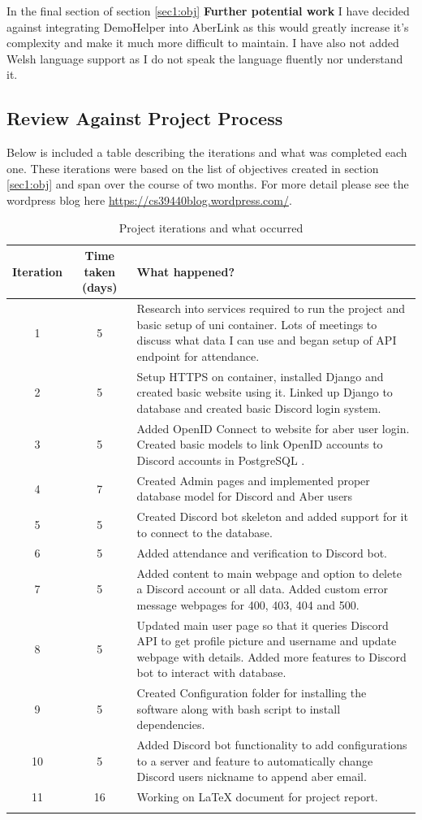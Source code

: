 In the final section of section \ref{sec1:obj} \textbf{Further potential work} I have decided against integrating DemoHelper into AberLink as this would greatly increase it's complexity and make it much more difficult to maintain. I have also not added Welsh language support as I do not speak the language fluently nor understand it.

\subsection{Review Against Project Process}\label{sec3:pp}

Below is included a table describing the iterations and what was completed each one. These iterations were based on the list of objectives created in section \ref{sec1:obj} and span over the course of two months. For more detail please see the wordpress blog here \href{https://cs39440blog.wordpress.com/}{https://cs39440blog.wordpress.com/}.

\begin{longtable}[H]{| c | c | p{9cm} |}
\hline
Iteration & Time taken (days) & What happened? \\
\hline
1 & 5 & Research into services required to run the project and basic setup of uni container. Lots of meetings to discuss what data I can use and began setup of API endpoint for attendance. \\
\hline
2 & 5 & Setup HTTPS on container, installed Django \cite{Django} and created basic website using it. Linked up Django to database and created basic Discord login system. \\
\hline
3 & 5 & Added OpenID Connect \cite{OpenID} to website for aber user login. Created basic models to link OpenID accounts to Discord accounts in PostgreSQL \cite{psql}. \\
\hline
4 & 7 & Created Admin pages and implemented proper database model for Discord and Aber users\\
\hline
5 & 5 & Created Discord bot skeleton and added support for it to connect to the database.\\
\hline
6 & 5 & Added attendance and verification to Discord bot. \\
\hline
7 & 5 & Added content to main webpage and option to delete a Discord account or all data. Added custom error message webpages for 400, 403, 404 and 500. \\
\hline
8 & 5 & Updated main user page so that it queries Discord API to get profile picture and username and update webpage with details. Added more features to Discord bot to interact with database.\\
\hline
9 & 5 & Created Configuration folder for installing the software along with bash script to install dependencies.\\
\hline
10 & 5 & Added Discord bot functionality to add configurations to a server and feature to automatically change Discord users nickname to append aber email.\\
\hline
11 & 16 & Working on LaTeX document for project report. \\
\hline
\caption{Project iterations and what occurred}
\label{tab:project-iterations}
\end{longtable}

